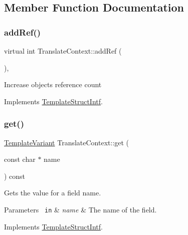 \subsection{Member Function Documentation}
\mbox{\label{class_translate_context_a8c6e3af2496041690177372ac2bf56cf}} 
\subsubsection{\texorpdfstring{addRef()}{addRef()}}
{\footnotesize\ttfamily virtual int Translate\+Context\+::add\+Ref (\begin{DoxyParamCaption}{ }\end{DoxyParamCaption})\hspace{0.3cm}{\ttfamily [inline]}, {\ttfamily [virtual]}}

Increase object\textquotesingle{}s reference count 

Implements \mbox{\hyperlink{class_template_struct_intf_a05fe97ad47633beb326f69686faed581}{Template\+Struct\+Intf}}.

\mbox{\label{class_translate_context_ab0fad4b75cd53cb3c22e8e1adee1c260}} 
\subsubsection{\texorpdfstring{get()}{get()}}
{\footnotesize\ttfamily \mbox{\hyperlink{class_template_variant}{Template\+Variant}} Translate\+Context\+::get (\begin{DoxyParamCaption}\item[{const char $\ast$}]{name }\end{DoxyParamCaption}) const\hspace{0.3cm}{\ttfamily [virtual]}}

Gets the value for a field name. 
\begin{DoxyParams}[1]{Parameters}
\mbox{\texttt{ in}}  & {\em name} & The name of the field. \\
\hline
\end{DoxyParams}


Implements \mbox{\hyperlink{class_template_struct_intf_a3d610cb81b4adbb531ebed3aa3d09b51}{Template\+Struct\+Intf}}.


